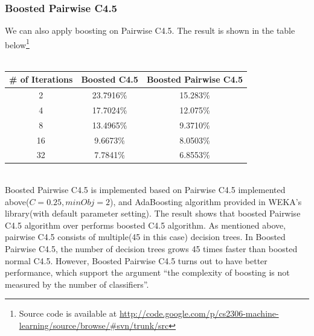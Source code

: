 \documentclass[a4paper,11pt]{nurop}
\begin{document}
\subsubsection{Boosted Pairwise C4.5}
We can also apply boosting on Pairwise C4.5. The result is shown in the table below\footnote{Source code is available at \url{http://code.google.com/p/cs2306-machine-learning/source/browse/#svn/trunk/src}}\\
\vspace{0.5cm}\\
\begin{tabular}{c c c}
\# of Iterations	& Boosted C4.5 & Boosted Pairwise C4.5\\
\hline \hline
	2		& 23.7916\% & 15.283\%  \\
	4		& 17.7024\% & 12.075\%  \\
	8		& 13.4965\% & 9.3710\%  \\
	16		& 9.6673\%  & 8.0503\%  \\
    32      & 7.7841\%  & 6.8553\%\\
\end{tabular}
\vspace{0.5cm}\\
Boosted Pairwise C4.5 is implemented based on Pairwise C4.5 implemented above($C=0.25,minObj=2$), and AdaBoosting algorithm provided in WEKA's library(with default parameter setting). The result shows that boosted Pairwise C4.5 algorithm over performs boosted C4.5 algorithm. As mentioned above, pairwise C4.5 consists of multiple(45 in this case) decision trees. In Boosted Pairwise C4.5, the number of decision trees grows 45 times faster than boosted normal C4.5. However, Boosted Pairwise C4.5 turns out to have better performance, which support the argument ``the complexity of boosting is not measured by the number of classifiers''.
\end{document}
